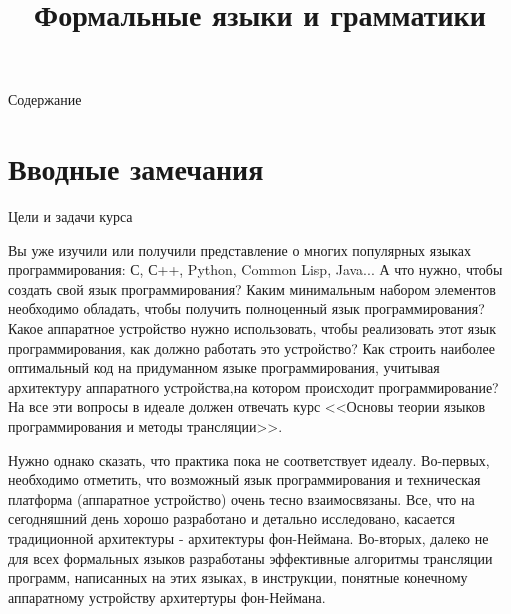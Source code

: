 \documentclass[12pt, pdf, hyperref={unicode},handout]{beamer}
\title[Лекция 1]{\Huge{Формальные языки и грамматики}}
\author[\textcopyright   Артамонов Ю.Н.]{}
\institute[]{}
\date{}
\begin{document}
\begin{frame}
  \titlepage
\end{frame}

\begin{frame}{Содержание}
  \tableofcontents
\end{frame}

\section{Вводные замечания}


\begin{frame}{Цели и задачи курса}
  \begin{block}

    \small{
      Вы уже изучили или получили представление о многих популярных языках программирования: С, С++, Python, Common Lisp, Java... А что нужно, чтобы создать свой язык программирования? Каким минимальным набором элементов необходимо обладать, чтобы получить полноценный язык программирования? Какое аппаратное устройство нужно использовать, чтобы реализовать этот язык программирования, как должно работать это устройство? Как строить наиболее оптимальный код на придуманном языке программирования, учитывая архитектуру аппаратного устройства,на котором происходит программирование? На все эти вопросы в идеале должен отвечать курс <<Основы теории языков программирования и методы трансляции>>.

      Нужно однако сказать, что практика пока не соответствует идеалу. Во-первых, необходимо отметить, что возможный язык программирования и техническая платформа (аппаратное устройство) очень тесно взаимосвязаны. Все, что на сегодняшний день хорошо разработано и детально исследовано, касается традиционной архитектуры  - архитектуры фон-Неймана. Во-вторых, далеко не для всех формальных языков разработаны эффективные алгоритмы трансляции программ, написанных на этих языках, в инструкции, понятные конечному аппаратному устройству  архитертуры фон-Неймана.


}

  \end{block}
  
\end{frame}
\end{document}
